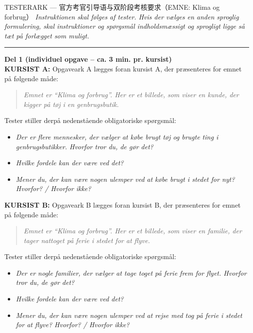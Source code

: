 \vspace{0.35em}
\begin{emailbox}{TESTERARK --- 官方考官引导语与双阶段考核要求（EMNE: Klima og forbrug）}
\small
\textit{Instruktionen skal følges af tester. Hvis der vælges en anden sproglig formulering, skal instruktioner og spørgsmål indholdsmæssigt og sprogligt ligge så tæt på forlægget som muligt.}

\vspace{0.35em}
\hrule
\vspace{0.35em}
\normalsize
\textbf{\color{NCDRed}Del 1 (individuel opgave -- ca. 3 min. pr. kursist)}\\
\textbf{\color{NCDNavy}KURSIST A:} Opgaveark A lægges foran kursist A, der præsenteres for emnet på følgende måde:
\begin{quote}
\textit{Emnet er “Klima og forbrug”. Her er et billede, som viser en kunde, der kigger på tøj i en genbrugsbutik.}
\end{quote}
Tester stiller derpå nedenstående obligatoriske spørgsmål:
\begin{itemize}[leftmargin=1.5em, itemsep=0.12em]
  \item \textit{Der er flere mennesker, der vælger at købe brugt tøj og brugte ting i genbrugsbutikker. Hvorfor tror du, de gør det?}
  \item \textit{Hvilke fordele kan der være ved det?}
  \item \textit{Mener du, der kan være nogen ulemper ved at købe brugt i stedet for nyt? Hvorfor? / Hvorfor ikke?}
\end{itemize}

\vspace{0.2em}
\textbf{\color{NCDNavy}KURSIST B:} Opgaveark B lægges foran kursist B, der præsenteres for emnet på følgende måde:
\begin{quote}
\textit{Emnet er “Klima og forbrug”. Her er et billede, som viser en familie, der tager nattoget på ferie i stedet for at flyve.}
\end{quote}
Tester stiller derpå nedenstående obligatoriske spørgsmål:
\begin{itemize}[leftmargin=1.5em, itemsep=0.12em]
  \item \textit{Der er nogle familier, der vælger at tage toget på ferie frem for flyet. Hvorfor tror du, de gør det?}
  \item \textit{Hvilke fordele kan der være ved det?}
  \item \textit{Mener du, der kan være nogen ulemper ved at rejse med tog på ferie i stedet for at flyve? Hvorfor? / Hvorfor ikke?}
\end{itemize}


\end{emailbox}
